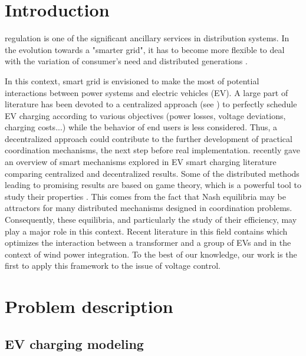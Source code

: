 \documentclass[journal]{IEEEtran}
\begin{document}
\section{Introduction}



 regulation is one of the significant ancillary services  \cite{Geth2012}  in distribution systems. In the evolution towards a "smarter grid", it has to become more flexible to deal with the variation of consumer's need and distributed generations \cite{Baran2007}.   

In this context, smart grid is envisioned to make the most of potential interactions between power systems and electric vehicles (EV). A large part of literature has been devoted to a centralized approach (see \cite{Clement-Nyns2009}) to perfectly schedule EV charging according to various objectives (power losses, voltage deviations, charging costs...) while the behavior of end users is less considered. Thus, a decentralized approach could contribute to the further development of practical coordination mechanisms, the next step before real implementation. \cite{Leemput2011} recently gave an overview of smart mechanisms explored in EV smart charging literature comparing centralized and decentralized results. Some of the distributed methods leading to promising results are based on game theory, which is a powerful tool to study their properties \cite{Saad2012}. This comes from the fact that Nash equilibria may be attractors for many distributed mechanisms designed in coordination problems. Consequently, these equilibria, and particularly the study of their efficiency, may play a major role in this context. Recent literature in this field contains \cite{Gan2012} which optimizes the interaction between a transformer and a group of EVs and \cite{Wu2012} in the context of wind power integration. To the best of our knowledge, our work is the first to apply this framework to the issue of voltage control.

\section{Problem description}


\subsection{EV charging modeling}
\end{document}
